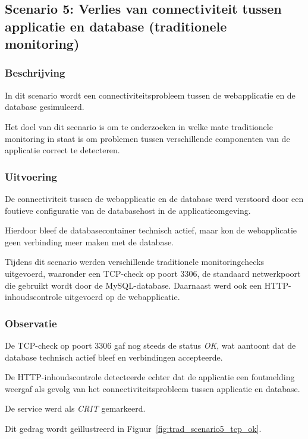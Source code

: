 \subsection{Scenario 5: Verlies van connectiviteit tussen applicatie en database (traditionele monitoring)}

\subsubsection{Beschrijving}

In dit scenario wordt een connectiviteitsprobleem tussen de webapplicatie en de database gesimuleerd.

Het doel van dit scenario is om te onderzoeken in welke mate traditionele monitoring in staat is om problemen tussen verschillende componenten van de applicatie correct te detecteren.

\subsubsection{Uitvoering}

De connectiviteit tussen de webapplicatie en de database werd verstoord door een foutieve configuratie van de databasehost in de applicatieomgeving.

Hierdoor bleef de databasecontainer technisch actief, maar kon de webapplicatie geen verbinding meer maken met de database.

Tijdens dit scenario werden verschillende traditionele monitoringchecks uitgevoerd, waaronder een TCP-check op poort 3306, de standaard netwerkpoort die gebruikt wordt door de MySQL-database. Daarnaast werd ook een HTTP-inhoudscontrole uitgevoerd op de webapplicatie.

\subsubsection{Observatie}

De TCP-check op poort 3306 gaf nog steeds de status \textit{OK}, wat aantoont dat de database technisch actief bleef en verbindingen accepteerde.

De HTTP-inhoudscontrole detecteerde echter dat de applicatie een foutmelding weergaf als gevolg van het connectiviteitsprobleem tussen applicatie en database.

De service werd als \textit{CRIT} gemarkeerd.

Dit gedrag wordt geïllustreerd in Figuur~\ref{fig:trad_scenario5_tcp_ok}.

